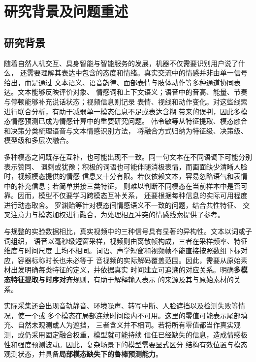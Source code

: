 \documentclass[bwprint]{gmcmthesis}
\begin{document}
\maketoc

\clearpage

\section{研究背景及问题重述}
\label{sec:problem}

\subsection{研究背景}

随着自然人机交互、具身智能与智能服务的发展，机器不仅需要识别用户说了什么，
还需要理解其表达中包含的态度和情绪。真实交流中的情感并非由单一信号给出，而是通过
文本语义、语音韵律、面部表情与肢体动作等多种通道协同表达。文本能够反映评价对象、
情感词和上下文语义；语音中的音高、能量、节奏与停顿能够补充说话状态；视频信息则记录
表情、视线和动作变化。对这些线索进行联合分析，有助于减弱单一模态信息不足或表达含糊
带来的误判，因此多模态情感预测已成为情感计算中的重要研究问题。
韩令敏等\citep{han2025review}从特征提取、模态融合和决策分类梳理语音与文本情感识别方法，
将融合方式归纳为特征级、决策级、模型级和多层次融合。

多种模态之间既存在互补，也可能出现不一致。同一句文本在不同语调下可能分别表示赞同、
讽刺或犹豫；积极的词语也可能伴随消极表情，而画面缺少清晰人脸时，视频模态提供的情感
信息又十分有限。若仅依赖文本，容易忽略语气和表情中的补充信息；若简单拼接三类特征，
则难以判断不同模态在当前样本中是否可靠。因而，模型不仅要学习跨模态互补关系，
还要根据每种信息的实际可用程度进行动态取舍。
罗渊贻等\citep{luo2025inconsistency}针对模态间情感语义不一致的问题，结合共性特征、
交叉注意力与模态加权进行融合，为处理相互冲突的情感线索提供了参考。

与规整的实验数据相比，真实视频中的三种信号具有显著的异构性。文本以词或子词组织，
语音以毫秒级短窗采样，视频则由离散帧构成，三者在采样频率、特征维度与时间尺度
上均不相同。词语、声学短窗和视频帧不能直接按照数组下标对应，容器标称时长也未必等于
音视频的实际解码覆盖范围。因此，需要从原始素材出发明确每类特征的定义，并依据真实
时间建立可追溯的对应关系。明确\textbf{多模态特征提取与时序对齐}规则，有助于解释输入表示
的来源及其与原始素材的关系。

实际采集还会出现音轨静音、环境噪声、转写中断、人脸遮挡以及检测失败等情况，使一个或
多个模态在局部连续时间段内不可用。这里的零值可能表示尾部填充、自然未观测或人为遮挡，
三者含义并不相同。若将所有零值都当作真实观测，或仍采用固定融合权重，模型就可能持续
信任已经缺失的信息，造成情感极性和强度预测波动。因此，复杂场景下的模型需要显式区分
结构有效位置与模态观测状态，并具备\textbf{局部模态缺失下的鲁棒预测能力}。
\end{document}
